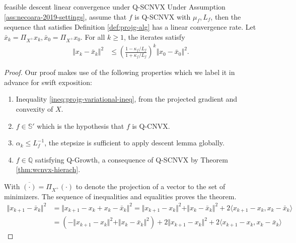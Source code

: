 \documentclass[12pt]{report}
\begin{document}
            \begin{theorem}{feasible descent linear convergence under Q-SCNVX}
                Under Assumption \ref{ass:necoara-2019-settings}, assume that $f$ is Q-SCNVX with $\mu_f, L_f$, then the sequence that satisfies Definition \ref{def:projg-alg} has a linear convergence rate. 
                Let $\bar x_k = \Pi_{X^+}x_k, \bar x_0 = \Pi_{X^+} x_0$. 
                For all $k \ge 1$, the iterates satisfy
                \begin{align*}
                    \Vert x_k - \bar x_k\Vert^2 &\le \left(
                        \frac{1 - \kappa_f/L_f}{1 + \kappa_f/L_f}
                    \right)^k \Vert x_0 - \bar x_0\Vert^2. 
                \end{align*}
            \end{theorem}
            \begin{proof}
                Our proof makes use of the following properties which we label it in advance for swift exposition: 
                \begin{enumerate}
                    \item Inequality \eqref{ineq:projg-variational-ineq}, from the projected gradient and convexity of $X$. 
                    \item $f \in \mathbb S'$ which is the hypothesis that $f$ is Q-CNVX. 
                    \item $\alpha_k \le L_f^{-1}$, the stepsize is sufficient to apply descent lemma globally. 
                    \item $f \in \mathbb Q$ satisfying Q-Growth, a consequence of Q-SCNVX by Theorem \ref{thm:wcnvx-hierach}. 
                \end{enumerate}
                With $\overline{(\cdot)} = \Pi_{X^+}(\cdot)$ to denote the projection of a vector to the set of minimizers. 
                The sequence of inequalities and equalities proves the theorem. 
                {\allowdisplaybreaks
                \begin{align*}
                    \Vert x_{k + 1} - \bar x_k\Vert^2
                    &= 
                    \Vert x_{k + 1} - x_k + x_k - \bar x_k\Vert^2 
                    = \Vert x_{k + 1} - x_k\Vert^2 + \Vert x_k - \bar x_k\Vert^2 + 2\langle x_{k + 1} - x_k, x_k - \bar x_k\rangle
                    \\
                    &= (- \Vert x_{k + 1} - x_k\Vert^2 + \Vert x_k - \bar x_k\Vert^2)
                    + 2\Vert x_{k + 1} - x_k\Vert^2 + 2\langle x_{k + 1} - x_k, x_k - \bar x_k\rangle

\end{align*}}
\end{proof}
\end{document}
